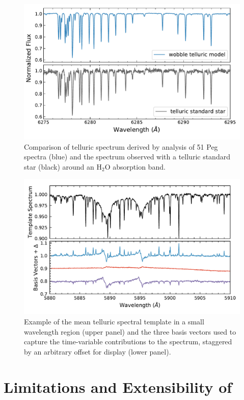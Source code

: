 \documentclass[modern]{aastex62}
\begin{document}
\begin{figure}
\centering
\includegraphics[width=5in]{telluric_standard}
\caption{Comparison of telluric spectrum derived by \wobble analysis of 51 Peg spectra (blue) and the spectrum observed with a telluric standard star (black) around an H$_2$O absorption band. }
\label{fig:telluric_standard}
\end{figure}

\begin{figure}
\centering
\includegraphics[width=5in]{telluric_basis2}
\caption{Example of the mean telluric spectral template in a small wavelength region (upper panel) and the three basis vectors used to capture the time-variable contributions to the spectrum, staggered by an arbitrary offset for display (lower panel).}
\label{fig:telluric_basis}
\end{figure}

\section{Limitations and Extensibility of \wobble}
\label{s:future}
\end{document}
